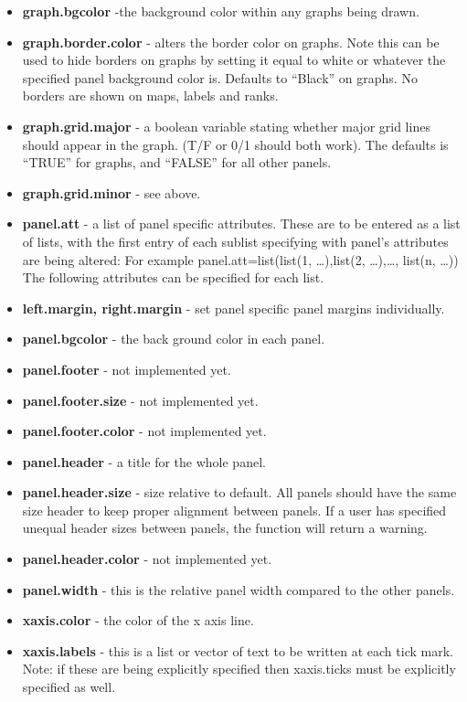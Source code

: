 \documentclass{article}
\begin{document}
\begin{itemize}
\item  \textbf{graph.bgcolor} -the background color within any graphs being drawn.
\item  \textbf{graph.border.color} - alters the border color on graphs. Note this can be used to hide borders on graphs by setting it equal to white or whatever the specified panel background color is. Defaults to ``Black'' on graphs. No borders are shown on maps, labels and ranks.
\item  \textbf{graph.grid.major} - a boolean variable stating whether major grid lines should appear in the graph. (T/F or 0/1 should both work). The defaults is ``TRUE'' for graphs, and ``FALSE'' for all other panels.
\item  \textbf{graph.grid.minor} - see above.
\item  \textbf{panel.att} - a list of panel specific attributes. These are to be entered as a list of lists, with the first entry of each
sublist specifying with panel's attributes are being altered:
For example
panel.att=list(list(1, \ldots),list(2, \ldots),\ldots, list(n, \ldots))
The following attributes can be specified for each list.
\item \textbf{left.margin, right.margin} - set panel specific panel margins individually.
\item  \textbf{panel.bgcolor} - the back ground color in each panel.
\item  \textbf{panel.footer} - not implemented yet.
\item  \textbf{panel.footer.size} - not implemented yet.
\item  \textbf{panel.footer.color} - not implemented yet.
\item  \textbf{panel.header} - a title for the whole panel.
\item  \textbf{panel.header.size} - size relative to default. All panels should have the same size header to keep proper alignment between panels. If a user has specified unequal header sizes between panels, the function will return a warning.
\item \textbf{panel.header.color} - not implemented yet.
\item  \textbf{panel.width} - this is the relative panel width compared to the other panels.
\item  \textbf{xaxis.color} - the color of the x axis line.
\item  \textbf{xaxis.labels} - this is a list or vector of text to be written at each tick mark. Note: if these are being explicitly specified then xaxis.ticks must be explicitly specified as well.

\end{itemize}
\end{document}
